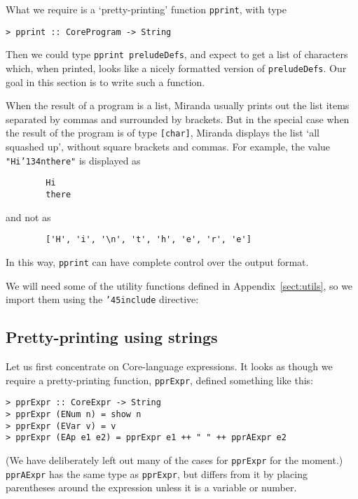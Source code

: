 What we require is a `pretty-printing' function \mbox{\tt pprint}, with type
\begin{verbatim}
> pprint :: CoreProgram -> String
\end{verbatim}
%
Then we could type \mbox{\tt pprint\ preludeDefs}, and expect to get a list of
characters which, when printed, looks like a nicely formatted version of
\mbox{\tt preludeDefs}.  Our goal in this section is to write such a function.

When the result of a program is a list, Miranda usually prints out the list
items separated by commas and surrounded by brackets.  But in the special
case when the result of the program is of type \mbox{\tt [char]}, Miranda
displays the list `all squashed up', without square brackets and commas.
For example, the value \mbox{\tt "Hi{\char'134}nthere"} is displayed as
\begin{verbatim}
        Hi
        there
\end{verbatim}
and not as
\begin{verbatim}
        ['H', 'i', '\n', 't', 'h', 'e', 'r', 'e']
\end{verbatim}
In this way, \mbox{\tt pprint} can have complete control over the output format.

We will need some of the utility functions defined in Appendix~\ref{sect:utils},
so we import them using the \mbox{\tt {\char'45}include} directive:


\subsection{Pretty-printing using strings}
\label{sect:foldl-example}

Let us first concentrate on Core-language expressions.  It looks as though
we require a pretty-printing function, \mbox{\tt pprExpr}, defined something like this:
\begin{verbatim}
> pprExpr :: CoreExpr -> String
> pprExpr (ENum n) = show n
> pprExpr (EVar v) = v
> pprExpr (EAp e1 e2) = pprExpr e1 ++ " " ++ pprAExpr e2
\end{verbatim}
%
%
%
%
(We have deliberately left out many of the cases for \mbox{\tt pprExpr} for the
moment.)
\mbox{\tt pprAExpr} has the same type as \mbox{\tt pprExpr}, but differs from it by
placing parentheses
around the expression unless it is a variable or number.

